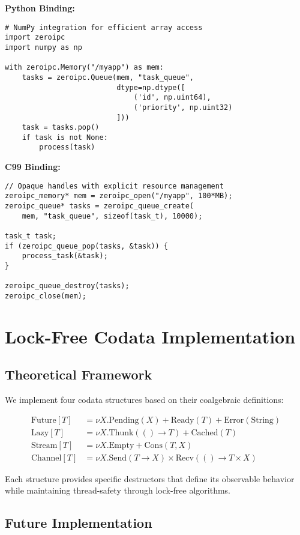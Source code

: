 \documentclass[11pt]{article}
\begin{document}
\textbf{Python Binding:}
\begin{lstlisting}
# NumPy integration for efficient array access
import zeroipc
import numpy as np

with zeroipc.Memory("/myapp") as mem:
    tasks = zeroipc.Queue(mem, "task_queue", 
                          dtype=np.dtype([
                              ('id', np.uint64),
                              ('priority', np.uint32)
                          ]))
    task = tasks.pop()
    if task is not None:
        process(task)
\end{lstlisting}

\textbf{C99 Binding:}
\begin{lstlisting}
// Opaque handles with explicit resource management
zeroipc_memory* mem = zeroipc_open("/myapp", 100*MB);
zeroipc_queue* tasks = zeroipc_queue_create(
    mem, "task_queue", sizeof(task_t), 10000);

task_t task;
if (zeroipc_queue_pop(tasks, &task)) {
    process_task(&task);
}

zeroipc_queue_destroy(tasks);
zeroipc_close(mem);
\end{lstlisting}

\section{Lock-Free Codata Implementation}

\subsection{Theoretical Framework}

We implement four codata structures based on their coalgebraic definitions:

\begin{align}
\text{Future}[T] &= \nu X. \text{Pending}(X) + \text{Ready}(T) + \text{Error}(\text{String}) \\
\text{Lazy}[T] &= \nu X. \text{Thunk}(() \to T) + \text{Cached}(T) \\
\text{Stream}[T] &= \nu X. \text{Empty} + \text{Cons}(T, X) \\
\text{Channel}[T] &= \nu X. \text{Send}(T \to X) \times \text{Recv}(() \to T \times X)
\end{align}

Each structure provides specific destructors that define its observable behavior while maintaining thread-safety through lock-free algorithms.

\subsection{Future Implementation}
\end{document}
